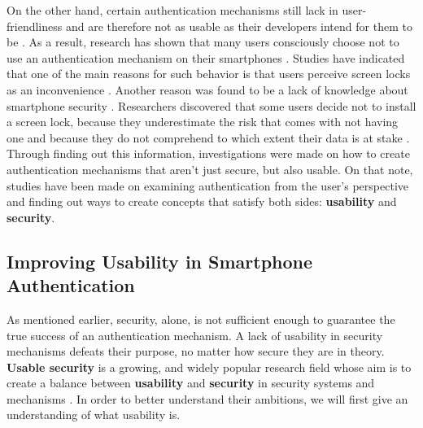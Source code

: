 On the other hand, certain authentication mechanisms still lack in user-friendliness and are therefore not as usable as their developers intend for them to be \cite{Schloeglhofer}. As a result, research has shown that many users consciously choose not to use an authentication mechanism on their smartphones \cite{ediss20251, Albayram:2017:BUL:3235924.3235929, Egelman:2014:YRL:2660267.2660273}. Studies have indicated that one of the main reasons for such behavior is that users perceive screen locks as an inconvenience \cite{Albayram:2017:BUL:3235924.3235929, ediss20251, harbach}. Another reason was found to be a lack of knowledge about smartphone security \cite{Albayram:2017:BUL:3235924.3235929, Adams:1999:UE:322796.322806}. Researchers discovered that some users decide not to install a screen lock, because they underestimate the risk that comes with not having one and because they do not comprehend to which extent their data is at stake \cite{Egelman:2014:YRL:2660267.2660273}. Through finding out this information, investigations were made on how to create authentication mechanisms that aren't just secure, but also usable. On that note, studies have been made on examining authentication from the user's perspective and finding out ways to create concepts that satisfy both sides: \textbf{usability} and \textbf{security}.  


\subsection{Improving Usability in Smartphone Authentication}

As mentioned earlier, security, alone, is not sufficient enough to guarantee the true success of an authentication mechanism. A lack of usability in security mechanisms defeats their purpose, no matter how secure they are in theory. \textbf{Usable security} is a growing, and widely popular research field whose aim is to create a balance between \textbf{usability} and \textbf{security} in security systems and mechanisms \cite{Realpe-Munoz, anonymous}. In order to better understand their ambitions, we will first give an understanding of what usability is. \\

